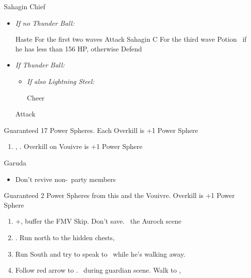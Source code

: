 \begin{battle}{Sahagin Chief}
    \begin{itemize}
        \item \textit{If no Thunder Ball:}
        \begin{itemize}
            \tidusf Haste \tidus
            \wakkaf For the first two waves Attack Sahagin C
            \wakkaf For the third wave Potion \tidus\ if he has less than 156 HP, otherwise Defend
        \end{itemize}
        \item \textit{If Thunder Ball:}
        \begin{itemize}
            \tidusf Cheer
            \wakkaf Attack
            \tidusf Haste \tidus
            \tidusf Haste \wakka
            \item \textit{If also Lightning Steel:}
            \begin{itemize}
                \tidusf Cheer
            \end{itemize}
        \end{itemize}
        \tidusf Attack
    \end{itemize}
    Guaranteed 17 Power Spheres. Each Overkill is +1 Power Sphere
\end{battle}
\begin{enumerate}[resume]
    \item \sd, \skippablefmv. Overkill on Vouivre is +1 Power Sphere
\end{enumerate}
\begin{battle}[1800]{Garuda}
    \begin{itemize}
        \tidusf Haste \auron
        \auronf Attack x3
        \wakkaf Defend, Potion if \tidus\ has less than 312 HP
        \tidusf Attack x1, then Defend
        \wakkaf Defend, Potion if \auron\ has less than 202 HP
        \auronf Attack x3
        \item Don't revive non-\auron\ party members
    \end{itemize}
    Guaranteed 2 Power Spheres from this and the Vouivre. Overkill is +1 Power Sphere
\end{battle}
\begin{enumerate}[resume]
    \item \cs+\skippablefmv[1:30], buffer the FMV Skip. Don't save. \sd\ the Auroch scene
    \item \cs[4:50]. Run north to the hidden chests, 
    \item Run South and try to speak to \auron\ while he's walking away.
    \item Follow red arrow to \yuna. \sd\ during guardian scene. Walk to \yuna, \cs[4:20]
\end{enumerate}